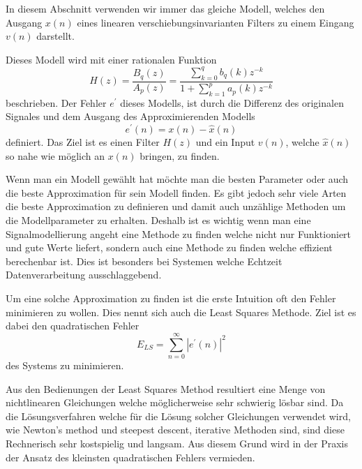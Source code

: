 In diesem Abschnitt verwenden wir immer das gleiche Modell, welches den Ausgang $x(n)$ eines linearen verschiebungsinvarianten Filters zu einem Eingang $v(n)$ darstellt.  
\begin{center}
\end{center}
Dieses Modell wird mit einer rationalen Funktion
\begin{equation}
H(z)
=
\frac{B_{q}(z)}{A_{p}(z)}
=
\frac{\displaystyle\sum_{k=0}^{q} b_{q}(k) z^{-k}}{1+\displaystyle\sum_{k=1}^{p} a_{p}(k) z^{-k}}
\end{equation}
beschrieben.
Der Fehler $e^{\prime}$ dieses Modells, ist durch die Differenz des originalen Signales und dem Ausgang des Approximierenden Modells
\begin{equation}
e^{\prime}(n)=x(n)-\hat{x}(n)
\end{equation}
definiert. 
Das Ziel ist es einen Filter $H(z)$ und ein Input $v(n)$, welche $\hat{x}(n)$ so nahe wie möglich an $x(n)$ bringen, zu finden.

Wenn man ein Modell gewählt hat möchte man die besten Parameter oder auch die beste Approximation für sein Modell finden.
Es gibt jedoch sehr viele Arten die beste Approximation zu definieren und damit auch unzählige Methoden um die Modellparameter zu erhalten.
Deshalb ist es wichtig wenn man eine Signalmodellierung angeht eine Methode zu finden welche nicht nur Funktioniert und gute Werte liefert, sondern auch eine Methode zu finden welche effizient berechenbar ist.
Dies ist besonders bei Systemen welche Echtzeit Datenverarbeitung ausschlaggebend.

Um eine solche Approximation zu finden ist die erste Intuition oft den Fehler minimieren zu wollen.
Dies nennt sich auch die Least Squares Methode.
Ziel ist es dabei den quadratischen Fehler 
\begin{equation}
E_{L S}
=
\sum_{n=0}^{\infty}\left|e^{\prime}(n)\right|^{2}
\end{equation}
des Systems zu minimieren.

Aus den Bedienungen der Least Squares Method resultiert eine Menge von nichtlinearen Gleichungen welche möglicherweise sehr schwierig lösbar sind.
Da die Lösungsverfahren welche für die Lösung solcher Gleichungen verwendet wird, wie Newton's method und steepest descent, iterative Methoden sind, sind diese Rechnerisch sehr kostspielig und langsam. 
Aus diesem Grund wird in der Praxis der Ansatz des kleinsten quadratischen Fehlers vermieden. 

